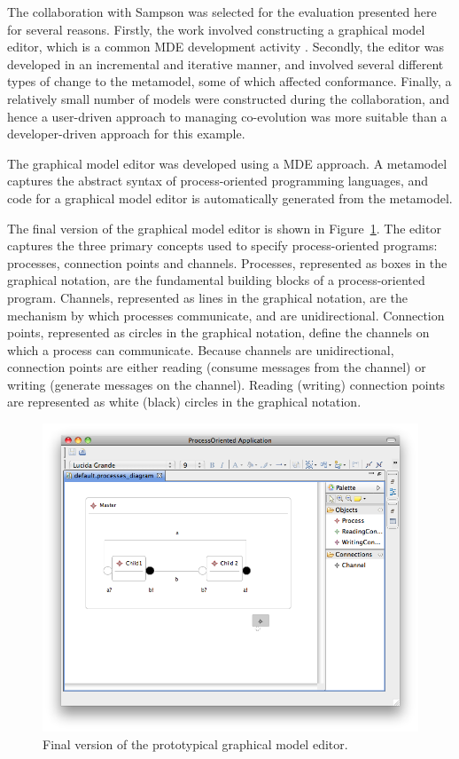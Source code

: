 The collaboration with Sampson was selected for the evaluation presented here for several reasons. Firstly, \cc the work involved constructing a graphical model editor, which is a common MDE development activity \cite{amyot06evaluation}. Secondly, the editor was developed in an incremental and iterative manner, and involved several different types of change to the metamodel, some of which affected conformance. Finally, a relatively small number of models were constructed during the collaboration, and hence a user-driven approach to managing co-evolution was more suitable than a developer-driven approach for this example.

The graphical model editor was developed using a MDE approach. A metamodel captures the abstract syntax of process-oriented programming languages, and code for a graphical model editor is automatically generated from the metamodel. 

The final version of the graphical model editor is shown in Figure~\ref{fig:po_final_graphical_editor}. The editor captures the three primary concepts used to specify process-oriented programs: processes, connection points and channels. Processes, represented as boxes in the graphical notation, are the fundamental building blocks of a process-oriented program. Channels, represented as lines in the graphical notation, are the mechanism by which processes communicate, and are unidirectional. Connection points, represented as circles in the graphical notation, define the channels on which a process can communicate. Because channels are unidirectional, connection points are either reading (consume messages from the channel) or writing (generate messages on the channel). Reading (writing) connection points are represented as white (black) circles in the graphical notation.  

\begin{figure}[htbp]
	\centering
	\includegraphics[width=13.5cm]{6.Evaluation/images/user_driven/po_final_editor.png}
	\caption{Final version of the prototypical graphical model editor.}
	\label{fig:po_final_graphical_editor}
\end{figure}

